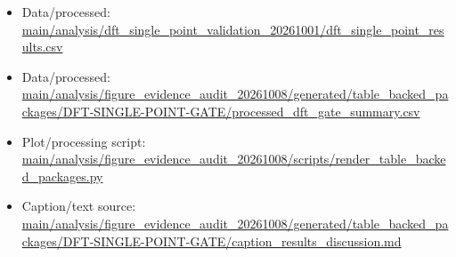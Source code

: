 \begin{itemize}[leftmargin=1.4em,noitemsep]
\item Data/processed: \begingroup\scriptsize\url{main/analysis/dft_single_point_validation_20261001/dft_single_point_results.csv}\endgroup
\item Data/processed: \begingroup\scriptsize\url{main/analysis/figure_evidence_audit_20261008/generated/table_backed_packages/DFT-SINGLE-POINT-GATE/processed_dft_gate_summary.csv}\endgroup
\item Plot/processing script: \begingroup\scriptsize\url{main/analysis/figure_evidence_audit_20261008/scripts/render_table_backed_packages.py}\endgroup
\item Caption/text source: \begingroup\scriptsize\url{main/analysis/figure_evidence_audit_20261008/generated/table_backed_packages/DFT-SINGLE-POINT-GATE/caption_results_discussion.md}\endgroup
\end{itemize}
